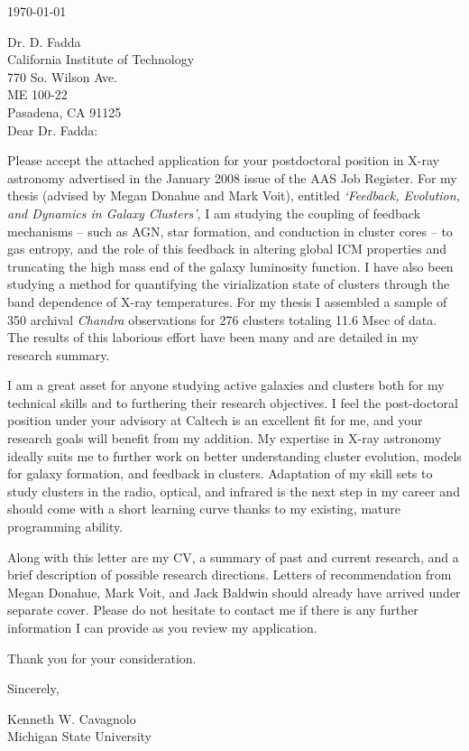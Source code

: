 \documentclass[11pt]{article}
\begin{document}
\today

Dr. D. Fadda\\
California Institute of Technology\\
770 So. Wilson Ave.\\
ME 100-22\\
Pasadena, CA 91125\\

Dear Dr. Fadda:

Please accept the attached application for your postdoctoral
position in X-ray astronomy advertised in the January 2008 issue
of the AAS Job Register. For my thesis (advised by Megan Donahue and
Mark Voit), entitled {\textit{`Feedback, Evolution, and Dynamics in
Galaxy Clusters'}}, I am studying the coupling of feedback mechanisms
-- such as AGN, star formation, and conduction in cluster cores -- to
gas entropy, and the role of this feedback in altering global ICM
properties and truncating the high mass end of the galaxy luminosity
function. I have also been studying a method for quantifying the
virialization state of clusters through the band dependence of X-ray
temperatures. For my thesis I assembled a sample of 350 archival
{\textit{Chandra}} observations for 276 clusters totaling 11.6 Msec of
data. The results of this laborious effort have been many and are
detailed in my research summary.

I am a great asset for anyone studying active galaxies and clusters
both for my technical skills and to furthering their research
objectives. I feel the post-doctoral position under your advisory at
Caltech is an excellent fit for me, and your research goals will benefit
from my addition. My expertise in X-ray astronomy ideally suits me to
further work on better understanding cluster evolution, models for
galaxy formation, and feedback in clusters. Adaptation of my skill
sets to study clusters in the radio, optical, and infrared is the next
step in my career and should come with a short learning curve thanks
to my existing, mature programming ability.

Along with this letter are my CV, a summary of past and
current research, and a brief description of possible research
directions. Letters of recommendation from Megan Donahue, Mark Voit,
and Jack Baldwin should already have arrived under separate
cover. Please do not hesitate to contact me if there is any further
information I can provide as you review my application.

Thank you for your consideration.

Sincerely,\\
\begin{minipage}{7.5in}
\end{minipage}
Kenneth W. Cavagnolo\\
Michigan State University
\end{document}

